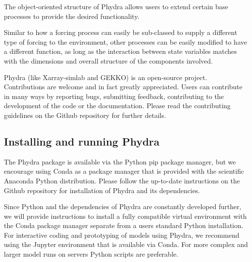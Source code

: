 \documentclass[journal abbreviation, manuscript]{copernicus}
\begin{document}
The object-oriented structure of Phydra allows users to extend certain base processes to provide the desired functionality. 

Similar to how a forcing process can easily be sub-classed to supply a different type of forcing to the environment, other processes can be easily modified to have a different function, as long as the interaction between state variables matches with the dimensions and overall structure of the components involved. 

Phydra (like Xarray-simlab and GEKKO) is an open-source project. Contributions are welcome and in fact greatly appreciated. Users can contribute in many ways by reporting bugs, submitting feedback, contributing to the development of the code or the documentation. Please read the contributing guidelines on the Github repository for further details.

\subsection{Installing and running Phydra}
The Phydra package is available via the Python pip package manager, but we encourage using Conda as a package manager that is provided with the scientific Anaconda Python distribution.
Please follow the up-to-date instructions on the Github repository for installation of Phydra and its dependencies.

Since Python and the dependencies of Phydra are constantly developed further, we will provide instructions to install a fully compatible virtual environment with the Conda package manager separate from a users standard Python installation. For interactive coding and prototyping of models using Phydra, we recommend using the Jupyter environment that is available via Conda. For more complex and larger model runs on servers Python scripts are preferable.
\end{document}
